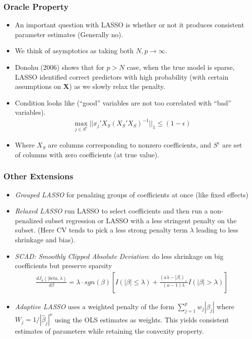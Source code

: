 \begin{frame}
\frametitle{Oracle Property}
\begin{itemize}
\item An important question with LASSO is whether or not it produces consistent parameter estimates (Generally \alert{no}).
\item We think of asymptotics as taking both $N,p\rightarrow \infty$.
\item Donohu (2006) shows that for $p > N$ case, when the true model is sparse, LASSO identified correct predictors with high probability (with certain assumptions on $\mathbf{X}$) as we slowly relax the penalty.
\item Condition looks like (``good'' variables are not too correlated with ``bad'' variables).
\begin{eqnarray*}
\max_{j \in S^{c}} || x_j' X_{S} (X_{S}' X_{S})^{-1} ||_{1} \leq (1 -\epsilon) 
\end{eqnarray*}
\item Where $X_{S}$ are columns corresponding to nonzero coefficients, and $S^{c}$ are set of columns with zero coefficients (at true value).
\end{itemize}
\end{frame}


\begin{frame}
\frametitle{Other Extensions}
\begin{itemize}
\item \textit{Grouped LASSO} for penalzing groups of coefficients at once (like fixed effects)
\item \textit{Relaxed LASSO} run LASSO to select coefficients and then run a non-penalized subset regression or LASSO with a less stringent penalty on the subset. (Here CV tends to pick a less strong penalty term $\lambda$ leading to less shrinkage and bias).
\item \textit{SCAD: Smoothly Clipped Absolute Deviation}: do less shrinkage on big coefficients but preserve sparsity
\begin{eqnarray*}
\frac{ d J_a(|beta,\lambda)}{d \beta} = \lambda \cdot sgn(\beta) \left[ I(| \beta| \leq \lambda) + \frac{(a \lambda - | \beta|)_{+}}{(a-1) \lambda} I (| \beta| > \lambda) \right]
\end{eqnarray*}
\item \textit{Adaptive LASSO} uses  a weighted penalty of the form $\sum_{j=1}^p w_j |\beta_j|$ where $W_j = 1/|\hat{\beta}_j|^{\nu}$ using the OLS estimates as weights. This yields consistent estimates of parameters while retaining the convexity property.
\end{itemize}
\end{frame}

